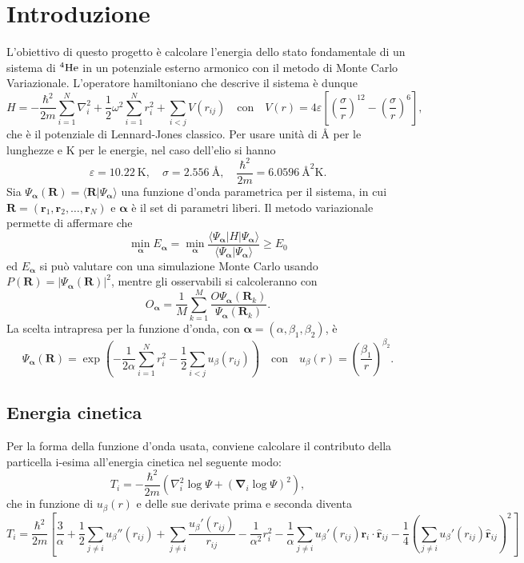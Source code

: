 \documentclass[a4paper, titlepage]{article}
\begin{document}

\newcommand{\sch}[0]{Schrödinger }
\newcommand{\lj}[0]{Lennard-Jones }
\newcommand{\boldalpha}[0]{{\boldsymbol{\alpha}}}

\section{Introduzione}
L'obiettivo di questo progetto è calcolare l'energia dello stato fondamentale di un sistema di $^4\ce{He}$ in un potenziale esterno armonico con il metodo di Monte Carlo Variazionale. L'operatore hamiltoniano che descrive il sistema è dunque
\begin{equation*}
    H = -\frac{\hbar^2}{2m} \sum_{i = 1}^N \nabla_i^2 + \frac{1}{2} \omega^2 \sum_{i = 1}^N r_i^2 + \sum_{i < j} V(r_{ij}) 
    \quad\text{con}\quad 
    V(r) = 4\varepsilon\left[\left(\frac{\sigma}{r}\right)^{12} - \left(\frac{\sigma}{r}\right)^{6}\right],
\end{equation*}
che è il potenziale di \lj classico. Per usare unità di \unit{\angstrom} per le lunghezze e \unit{\kelvin} per le energie, nel caso dell'elio si hanno
\[
\varepsilon = 10.22\ \unit{\kelvin}, \quad
\sigma = 2.556\ \unit{\angstrom}, \quad 
\frac{\hbar^2}{2m} = 6.0596\ \unit{\square\angstrom\kelvin}.
\]
Sia $\Psi_{\boldsymbol{\alpha}}(\mathbf{R}) = \langle\mathbf{R}|\Psi_{\boldsymbol{\alpha}}\rangle$ una funzione d'onda parametrica per il sistema, in cui $\mathbf{R} = (\mathbf{r}_1, \mathbf{r}_2, \dots, \mathbf{r}_N)$ e $\boldsymbol{\alpha}$ è il set di parametri liberi. Il metodo variazionale permette di affermare che
\[
\min_{\boldsymbol{\alpha}} E_{\boldsymbol{\alpha}} = \min_{\boldsymbol{\alpha}} \frac{\langle\Psi_{\boldsymbol{\alpha}}|H|\Psi_{\boldsymbol{\alpha}}\rangle}{\langle\Psi_{\boldsymbol{\alpha}}|\Psi_{\boldsymbol{\alpha}}\rangle} \geq E_0
\]
ed $E_{\boldsymbol{\alpha}}$ si può valutare con una simulazione Monte Carlo usando $P(\mathbf{R}) = |\Psi_{\boldsymbol{\alpha}}(\mathbf{R})|^2$, mentre gli osservabili si calcoleranno con
\[
O_\boldalpha = \frac{1}{M}\sum_{k = 1}^M \frac{O\Psi_\boldalpha(\mathbf{R}_k)}{\Psi_\boldalpha(\mathbf{R}_k)}.
\]
La scelta intrapresa per la funzione d'onda, con $\boldalpha = (\alpha, \beta_1, \beta_2)$, è 
\[
\Psi_\boldalpha(\mathbf{R}) = \exp\left(-\frac{1}{2\alpha}\sum_{i = 1}^Nr_i^2-\frac{1}{2}\sum_{i < j}u_\beta(r_{ij})\right) \quad\text{con}\quad u_\beta(r) = \left(\frac{\beta_1}{r}\right)^{\beta_2}.
\]

\subsection{Energia cinetica}
Per la forma della funzione d'onda usata, conviene calcolare il contributo della particella i-esima all'energia cinetica nel seguente modo:
\[
T_i = -\frac{\hbar^2}{2m}\left(\nabla_i^2\log\Psi + (\boldsymbol{\nabla}_i\log\Psi)^2\right),
\]
che in funzione di $u_\beta(r)$ e delle sue derivate prima e seconda diventa
\[
T_i = \frac{\hbar^2}{2m}
\left[
\frac{3}{\alpha} + 
\frac{1}{2}\sum_{j\neq i} u_\beta''(r_{ij}) + 
\sum_{j\neq i} \frac{u_\beta'(r_{ij})}{r_{ij}} -
\frac{1}{\alpha^2}r_i^2 - 
\frac{1}{\alpha} \sum_{j\neq i} u_\beta'(r_{ij}) \mathbf{r}_i \cdot \hat{\mathbf{r}}_{ij} - 
\frac{1}{4}\left(\sum_{j\neq i} u_\beta'(r_{ij}) \hat{\mathbf{r}}_{ij}\right)^2
\right]
\]
\end{document}
